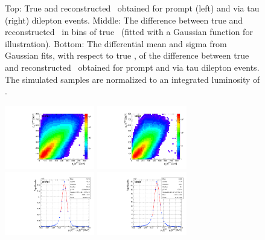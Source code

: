 \begin{figure}
\begin{center}
    \caption{\small Top: True and reconstructed \ytt\ obtained for prompt (left) and via tau (right) \ttbar dilepton events.
    Middle: The difference between true and reconstructed \ytt\ in bins of true \ytt\ (fitted with a Gaussian function for illustration).
    Bottom: The differential mean and sigma from Gaussian fits, with respect to true \ytt, of the difference between true and reconstructed \ytt\ obtained for prompt and via tau \ttbar dilepton events.
    The simulated samples are normalized to an integrated luminosity of \lumivalueRuniiUL.}
    \label{fig:kinrec:resolution-ytt}
 \end{center}
\end{figure}

\begin{figure}
  \begin{center}
    \includegraphics[width=0.35\textwidth]{fig_fullRun2UL/KinRecoResolutions/top_pT_genreco_prompt.pdf}
    \includegraphics[width=0.35\textwidth]{fig_fullRun2UL/KinRecoResolutions/top_pT_genreco_viatau.pdf}\\
    \includegraphics[width=0.35\textwidth]{fig_fullRun2UL/KinRecoResolutions/top_pT_residual_prompt.pdf}
    \includegraphics[width=0.35\textwidth]{fig_fullRun2UL/KinRecoResolutions/top_pT_residual_viatau.pdf}\\

\end{center}
\end{figure}
